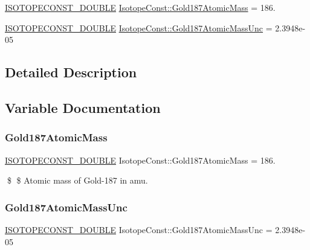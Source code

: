 \begin{DoxyCompactItemize}
\item 
\mbox{\hyperlink{group___isotope_const-_macros_ga8f45a7272ce02c0b4c65c44636ed719a}{I\+S\+O\+T\+O\+P\+E\+C\+O\+N\+S\+T\+\_\+\+D\+O\+U\+B\+LE}} \mbox{\hyperlink{group___isotope_const-_gold-_au187_ga6b528d768c5c3435b7a511e674dcd7c1}{Isotope\+Const\+::\+Gold187\+Atomic\+Mass}} = 186.
\item 
\mbox{\hyperlink{group___isotope_const-_macros_ga8f45a7272ce02c0b4c65c44636ed719a}{I\+S\+O\+T\+O\+P\+E\+C\+O\+N\+S\+T\+\_\+\+D\+O\+U\+B\+LE}} \mbox{\hyperlink{group___isotope_const-_gold-_au187_ga2bb599cc90bad6ecaaaaa11280d55e84}{Isotope\+Const\+::\+Gold187\+Atomic\+Mass\+Unc}} = 2.\+3948e-\/05
\end{DoxyCompactItemize}


\subsection{Detailed Description}


\subsection{Variable Documentation}
\mbox{\label{group___isotope_const-_gold-_au187_ga6b528d768c5c3435b7a511e674dcd7c1}} 
\subsubsection{\texorpdfstring{Gold187\+Atomic\+Mass}{Gold187AtomicMass}}
{\footnotesize\ttfamily \mbox{\hyperlink{group___isotope_const-_macros_ga8f45a7272ce02c0b4c65c44636ed719a}{I\+S\+O\+T\+O\+P\+E\+C\+O\+N\+S\+T\+\_\+\+D\+O\+U\+B\+LE}} Isotope\+Const\+::\+Gold187\+Atomic\+Mass = 186.}

\$ \$ Atomic mass of Gold-\/187 in amu. \mbox{\label{group___isotope_const-_gold-_au187_ga2bb599cc90bad6ecaaaaa11280d55e84}} 
\subsubsection{\texorpdfstring{Gold187\+Atomic\+Mass\+Unc}{Gold187AtomicMassUnc}}
{\footnotesize\ttfamily \mbox{\hyperlink{group___isotope_const-_macros_ga8f45a7272ce02c0b4c65c44636ed719a}{I\+S\+O\+T\+O\+P\+E\+C\+O\+N\+S\+T\+\_\+\+D\+O\+U\+B\+LE}} Isotope\+Const\+::\+Gold187\+Atomic\+Mass\+Unc = 2.\+3948e-\/05}

